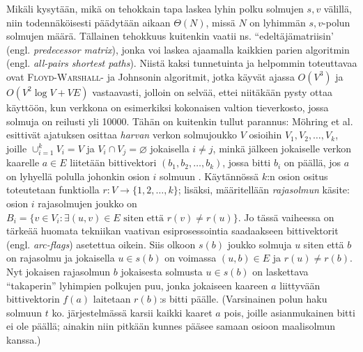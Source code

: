 \documentclass[12pt]{article}
\begin{document}
Mikäli kysytään, mikä on tehokkain tapa laskea lyhin polku solmujen $s, v$ välillä, niin todennäköisesti päädytään aikaan $\Theta(N)$, missä $N$ on lyhimmän $s, v$-polun solmujen määrä. Tällainen tehokkuus kuitenkin vaatii ns. ``edeltäjämatriisin' (engl. \textit{predecessor matrix}), jonka voi laskea ajaamalla kaikkien parien algoritmin (engl. \textit{all-pairs shortest paths}). Niistä kaksi tunnetuinta ja helpommin toteuttavaa ovat \textsc{Floyd-Warshall}- ja Johnsonin algoritmit, jotka käyvät ajassa $O(V^3)$ ja $O(V^2 \log V + VE)$ vastaavasti, jolloin on selvää, ettei niitäkään pysty ottaa käyttöön, kun verkkona on esimerkiksi kokonaisen valtion tieverkosto, jossa solmuja on reilusti yli 10000. Tähän on kuitenkin tullut parannus: Möhring et al. esittivät ajatuksen osittaa \textit{harvan} verkon solmujoukko $V$ osioihin $V_1, V_2, \dots, V_k$, joille $\cup_{i = 1}^k V_i = V$ ja $V_i \cap V_j = \varnothing$ jokaisella $i \neq j$, minkä jälkeen jokaiselle verkon kaarelle $a \in E$ liitetään bittivektori $(b_1, b_2, \dots, b_k)$, jossa bitti $b_i$ on päällä, jos $a$ on lyhyellä polulla johonkin osion $i$ solmuun \cite{Mohring07}. Käytännössä $k$:n osion ositus toteutetaan funktiolla $r \colon V \to \{1, 2, \dots, k\}$; lisäksi, määritellään \textit{rajasolmun} käsite: osion $i$ rajasolmujen joukko on $B_i = \{v \in V_i \colon \exists(u, v) \in E \text{ siten että } r(v) \neq r(u) \}$. Jo tässä vaiheessa on tärkeää huomata tekniikan vaativan esiprosessointia saadaakseen bittivektorit (engl. \textit{arc-flags}) asetettua oikein. Siis olkoon $s(b)$ joukko solmuja $u$ siten että $b$ on rajasolmu ja jokaisella $u \in s(b)$ on voimassa $(u, b) \in E$ ja $r(u) \neq r(b)$. Nyt jokaisen rajasolmun $b$ jokaisesta solmusta $u \in s(b)$ on laskettava ``takaperin'' lyhimpien polkujen puu, jonka jokaiseen kaareen $a$ liittyvään bittivektorin $f(a)$ laitetaan $r(b)$:s bitti päälle. (Varsinainen polun haku solmuun $t$ ko. järjestelmässä karsii kaikki kaaret $a$ pois, joille asianmukainen bitti ei ole päällä; ainakin niin pitkään kunnes pääsee samaan osioon maalisolmun kanssa.) 
\end{document}
